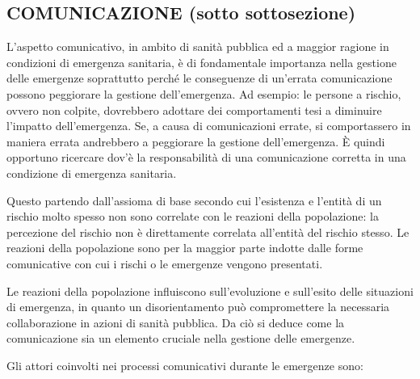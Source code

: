 \documentclass[]{article}
\begin{document}
\subsection{}\label{section}

\subsection{COMUNICAZIONE (sotto
sottosezione)}\label{comunicazione-sotto-sottosezione}

L'aspetto comunicativo, in ambito di sanità pubblica ed a maggior
ragione in condizioni di emergenza sanitaria, è di fondamentale
importanza nella gestione delle emergenze soprattutto perché le
conseguenze di un'errata comunicazione possono peggiorare la gestione
dell'emergenza. Ad esempio: le persone a rischio, ovvero non colpite,
dovrebbero adottare dei comportamenti tesi a diminuire l'impatto
dell'emergenza. Se, a causa di comunicazioni errate, si comportassero in
maniera errata andrebbero a peggiorare la gestione dell'emergenza. È
quindi opportuno ricercare dov'è la responsabilità di una comunicazione
corretta in una condizione di emergenza sanitaria.

Questo partendo dall'assioma di base secondo cui l'esistenza e l'entità
di un rischio molto spesso non sono correlate con le reazioni della
popolazione: la percezione del rischio non è direttamente correlata
all'entità del rischio stesso. Le reazioni della popolazione sono per la
maggior parte indotte dalle forme comunicative con cui i rischi o le
emergenze vengono presentati.

Le reazioni della popolazione influiscono sull'evoluzione e sull'esito
delle situazioni di emergenza, in quanto un disorientamento può
compromettere la necessaria collaborazione in azioni di sanità pubblica.
Da ciò si deduce come la comunicazione sia un elemento cruciale nella
gestione delle emergenze.

Gli attori coinvolti nei processi comunicativi durante le emergenze
sono:
\end{document}
